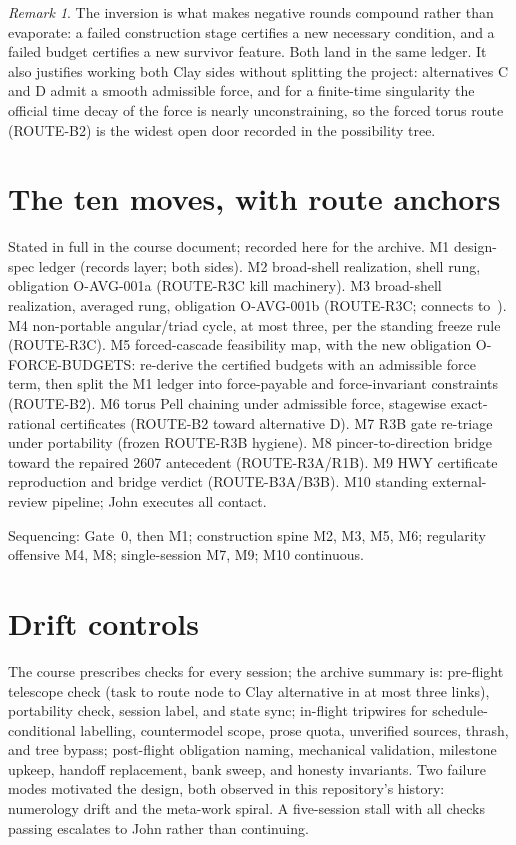\documentclass[11pt]{article}
\theoremstyle{remark}
\newtheorem{remark}[theorem]{Remark}
\begin{document}
\begin{remark}
The inversion is what makes negative rounds compound rather than
evaporate: a failed construction stage certifies a new necessary
condition, and a failed budget certifies a new survivor feature.  Both
land in the same ledger.  It also justifies working both Clay sides
without splitting the project: alternatives C and D admit a smooth
admissible force, and for a finite-time singularity the official time
decay of the force is nearly unconstraining, so the forced torus route
(ROUTE-B2) is the widest open door recorded in the possibility tree.
\end{remark}

\section{The ten moves, with route anchors}

Stated in full in the course document; recorded here for the archive.
M1 design-spec ledger (records layer; both sides).
M2 broad-shell realization, shell rung, obligation O-AVG-001a
(ROUTE-R3C kill machinery).
M3 broad-shell realization, averaged rung, obligation O-AVG-001b
(ROUTE-R3C; connects to~\cite{Tao16}).
M4 non-portable angular/triad cycle, at most three, per the standing
freeze rule (ROUTE-R3C).
M5 forced-cascade feasibility map, with the new obligation
O-FORCE-BUDGETS: re-derive the certified budgets with an admissible
force term, then split the M1 ledger into force-payable and
force-invariant constraints (ROUTE-B2).
M6 torus Pell chaining under admissible force, stagewise exact-rational
certificates (ROUTE-B2 toward alternative D).
M7 R3B gate re-triage under portability (frozen ROUTE-R3B hygiene).
M8 pincer-to-direction bridge toward the repaired 2607 antecedent
(ROUTE-R3A/R1B).
M9 HWY certificate reproduction and bridge verdict (ROUTE-B3A/B3B).
M10 standing external-review pipeline; John executes all contact.

Sequencing: Gate~0, then M1; construction spine M2, M3, M5, M6;
regularity offensive M4, M8; single-session M7, M9; M10 continuous.

\section{Drift controls}

The course prescribes checks for every session; the archive summary is:
pre-flight telescope check (task to route node to Clay alternative in
at most three links), portability check, session label, and state sync;
in-flight tripwires for schedule-conditional labelling, countermodel
scope, prose quota, unverified sources, thrash, and tree bypass;
post-flight obligation naming, mechanical validation, milestone upkeep,
handoff replacement, bank sweep, and honesty invariants.  Two failure
modes motivated the design, both observed in this repository's history:
numerology drift and the meta-work spiral.  A five-session stall with
all checks passing escalates to John rather than continuing.
\end{document}
